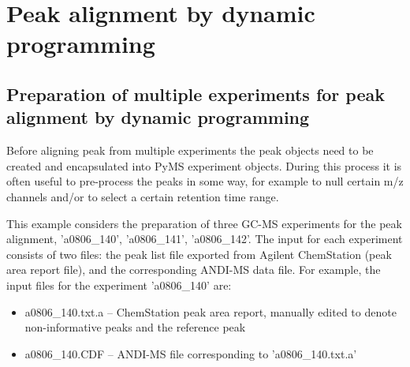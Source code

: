 

\chapter{Peak alignment by dynamic programming}

\section{Preparation of multiple experiments for peak alignment
by dynamic programming}


Before aligning peak from multiple experiments the peak objects need to be
created and encapsulated into PyMS experiment objects. During this process
it is often useful to pre-process the peaks in some way, for example to
null certain m/z channels and/or to select a certain retention time range.

This example considers the preparation of three GC-MS experiments for
the peak alignment, 'a0806\_140', 'a0806\_141', 'a0806\_142'. The input
for each experiment consists of two files: the peak list file exported
from Agilent ChemStation (peak area report file), and the corresponding
ANDI-MS data file. For example, the input files for the experiment
'a0806\_140' are:

\begin{itemize}
\item a0806\_140.txt.a -- ChemStation peak area report, manually edited
to denote non-informative peaks and the reference peak
\item a0806\_140.CDF -- ANDI-MS file corresponding to 'a0806\_140.txt.a'
\end{itemize}

